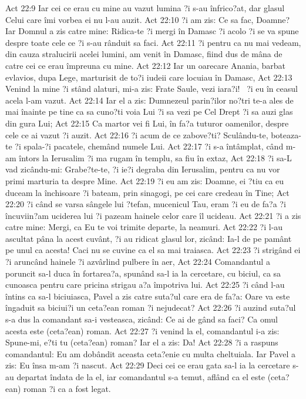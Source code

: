 Act 22:9  Iar cei ce erau cu mine au vazut lumina ?i s-au înfrico?at, dar glasul Celui care îmi vorbea ei nu l-au auzit.
Act 22:10  ?i am zis: Ce sa fac, Doamne? Iar Domnul a zis catre mine: Ridica-te ?i mergi în Damasc ?i acolo ?i se va spune despre toate cele ce ?i s-au rânduit sa faci.
Act 22:11  ?i pentru ca nu mai vedeam, din cauza stralucirii acelei lumini, am venit în Damasc, fiind dus de mâna de catre cei ce erau împreuna cu mine.
Act 22:12  Iar un oarecare Anania, barbat evlavios, dupa Lege, marturisit de to?i iudeii care locuiau în Damasc,
Act 22:13  Venind la mine ?i stând alaturi, mi-a zis: Frate Saule, vezi iara?i!  ?i eu în ceasul acela l-am vazut.
Act 22:14  Iar el a zis: Dumnezeul parin?ilor no?tri te-a ales de mai înainte pe tine ca sa cuno?ti voia Lui ?i sa vezi pe Cel Drept ?i sa auzi glas din gura Lui;
Act 22:15  Ca martor vei fi Lui, în fa?a tuturor oamenilor, despre cele ce ai vazut ?i auzit.
Act 22:16  ?i acum de ce zabove?ti? Sculându-te, boteaza-te ?i spala-?i pacatele, chemând numele Lui.
Act 22:17  ?i s-a întâmplat, când m-am întors la Ierusalim ?i ma rugam în templu, sa fiu în extaz,
Act 22:18  ?i sa-L vad zicându-mi: Grabe?te-te, ?i ie?i degraba din Ierusalim, pentru ca nu vor primi marturia ta despre Mine.
Act 22:19  ?i eu am zis: Doamne, ei ?tiu ca eu duceam la închisoare ?i bateam, prin sinagogi, pe cei care credeau în Tine;
Act 22:20  ?i când se varsa sângele lui ?tefan, mucenicul Tau, eram ?i eu de fa?a ?i încuviin?am uciderea lui ?i pazeam hainele celor care îl ucideau.
Act 22:21  ?i a zis catre mine: Mergi, ca Eu te voi trimite departe, la neamuri.
Act 22:22  ?i l-au ascultat pâna la acest cuvânt, ?i au ridicat glasul lor, zicând: Ia-l de pe pamânt pe unul ca acesta! Caci nu se cuvine ca el sa mai traiasca.
Act 22:23  ?i strigând ei ?i aruncând hainele ?i azvârlind pulbere în aer,
Act 22:24  Comandantul a poruncit sa-l duca în fortarea?a, spunând sa-l ia la cercetare, cu biciul, ca sa cunoasca pentru care pricina strigau a?a împotriva lui.
Act 22:25  ?i când l-au întins ca sa-l biciuiasca, Pavel a zis catre suta?ul care era de fa?a: Oare va este îngaduit sa biciui?i un ceta?ean roman ?i nejudecat?
Act 22:26  ?i auzind suta?ul s-a dus la comandant sa-i vesteasca, zicând: Ce ai de gând sa faci? Ca omul acesta este (ceta?ean) roman.
Act 22:27  ?i venind la el, comandantul i-a zis: Spune-mi, e?ti tu (ceta?ean) roman? Iar el a zis: Da!
Act 22:28  ?i a raspuns comandantul: Eu am dobândit aceasta ceta?enie cu multa cheltuiala. Iar Pavel a zis: Eu însa m-am ?i nascut.
Act 22:29  Deci cei ce erau gata sa-l ia la cercetare s-au departat îndata de la el, iar comandantul s-a temut, aflând ca el este (ceta?ean) roman ?i ca a fost legat.

